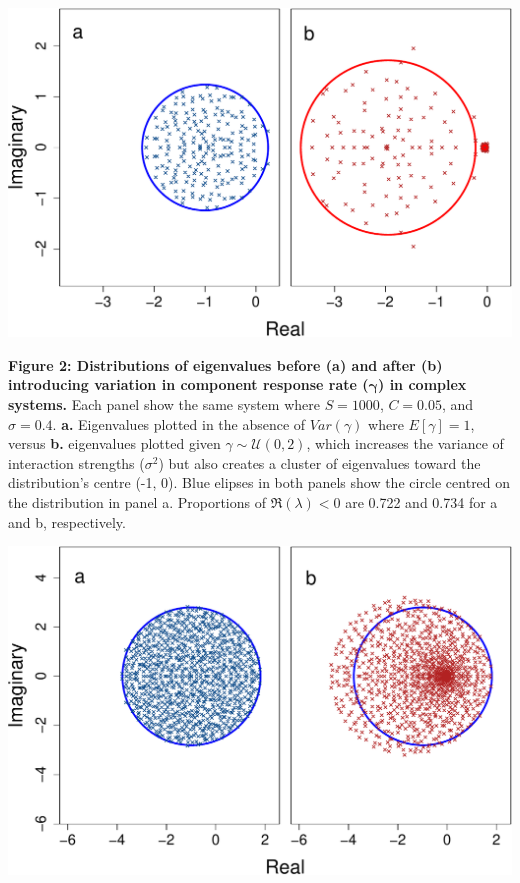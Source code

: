 \documentclass[]{article}
\begin{document}
\includegraphics{ms_files/figure-latex/unnamed-chunk-10-1.pdf}

\clearpage

\textbf{Figure 2: Distributions of eigenvalues before (a) and after (b)
introducing variation in component response rate
(\(\boldsymbol{\gamma}\)) in complex systems.} Each panel show the same
system where \(S = 1000\), \(C = 0.05\), and \(\sigma = 0.4\).
\textbf{a.} Eigenvalues plotted in the absence of \(Var(\gamma)\) where
\(E[\gamma] = 1\), versus \textbf{b.} eigenvalues plotted given
\(\gamma \sim \mathcal{U}(0, 2)\), which increases the variance of
interaction strengths (\(\sigma^{2}\)) but also creates a cluster of
eigenvalues toward the distribution's centre (-1, 0). Blue elipses in
both panels show the circle centred on the distribution in panel a.
Proportions of \(\Re(\lambda) < 0\) are 0.722 and 0.734 for a and b,
respectively.

\includegraphics{ms_files/figure-latex/unnamed-chunk-13-1.pdf}
\end{document}
